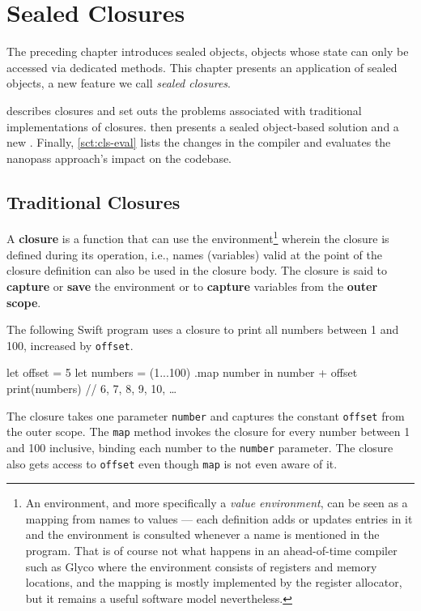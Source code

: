 \documentclass[main.tex]{subfiles}
\begin{document}
\onlyinsubfile{\mainmatter{}}

\chapter{Sealed Closures} \label{ch:cls}
The preceding chapter introduces sealed objects, objects whose state can only be accessed via dedicated methods. This chapter presents an application of sealed objects, a new feature we call \emph{sealed closures}.

 describes closures and set outs the problems associated with traditional implementations of closures.  then presents a sealed object-based solution and a new . Finally, \cref{sct:cls-eval} lists the changes in the compiler and evaluates the nanopass approach's impact on the codebase.

\section{Traditional Closures} \label{sct:cls-trad}
A \textbf{closure} is a function that can use the environment\footnote{An environment, and more specifically a \emph{value environment}, can be seen as a mapping from names to values — each definition adds or updates entries in it and the environment is consulted whenever a name is mentioned in the program. That is of course not what happens in an ahead-of-time compiler such as Glyco where the environment consists of registers and memory locations, and the mapping is mostly implemented by the register allocator, but it remains a useful software model nevertheless.} wherein the closure is defined during its operation, i.e., names (variables) valid at the point of the closure definition can also be used in the closure body. The closure is said to \textbf{capture} or \textbf{save} the environment or to \textbf{capture} variables from the \textbf{outer scope}.

The following Swift program uses a closure to print all numbers between 1 and 100, increased by \texttt{offset}.
\begin{swift}
	let offset = 5
	let numbers = (1...100)
		.map { number in number + offset }
	print(numbers)		// 6, 7, 8, 9, 10, …
\end{swift}
The closure takes one parameter \texttt{number} and captures the constant \texttt{offset} from the outer scope. The \texttt{map} method invokes the closure for every number between 1 and 100 inclusive, binding each number to the \texttt{number} parameter. The closure also gets access to \texttt{offset} even though \texttt{map} is not even aware of it.
\end{document}
